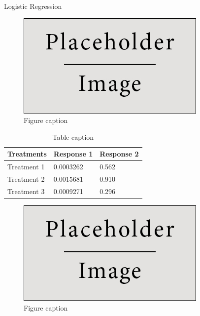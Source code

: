 \documentclass[final]{beamer}
\newlength{\onecolwid}
\newlength{\twocolwid}
\begin{document}
\begin{frame}[t]
\begin{columns}[t]
\begin{column}{\twocolwid}
\begin{columns}[t,totalwidth=\twocolwid]
\begin{column}{\onecolwid}
\begin{block}{Logistic Regression}
\begin{figure}
\includegraphics[width=0.8\linewidth]{placeholder.jpg}
\caption{Figure caption}
\end{figure}

\begin{table}
\vspace{2ex}
\begin{tabular}{l l l}
\toprule
\textbf{Treatments} & \textbf{Response 1} & \textbf{Response 2}\\
\midrule
Treatment 1 & 0.0003262 & 0.562 \\
Treatment 2 & 0.0015681 & 0.910 \\
Treatment 3 & 0.0009271 & 0.296 \\
\bottomrule
\end{tabular}
\caption{Table caption}
\end{table}

\begin{figure}
\includegraphics[width=0.8\linewidth]{placeholder.jpg}
\caption{Figure caption}
\end{figure}

\end{block}

\end{column} %

\end{columns} %


\end{column}
\end{columns}
\end{frame}
\end{document}
